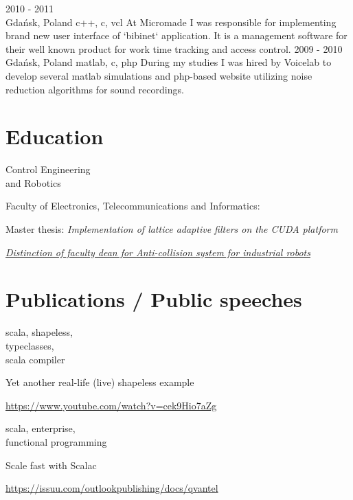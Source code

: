 \documentclass[a4paper,11pt]{cv4tw}%
\begin{document}
      {2010 - 2011\\Gdańsk, Poland}
      {c++, c, vcl}
      {At Micromade I was responsible for implementing brand new user interface of `bibinet` application.
        It is a management software for their well known product for work time tracking and access control.
      }
      {2009 - 2010\\Gdańsk, Poland}
      {matlab, c, php}
      {During my studies I was hired by Voicelab to develop several matlab simulations
        and php-based website utilizing noise reduction algorithms for sound recordings.
      }
\section{Education}
      {Control Engineering\\and Robotics}
      {Faculty of Electronics, Telecommunications and Informatics:
        \begin{missions}
          \item Master thesis: \textit{Implementation of lattice adaptive filters on the CUDA platform}
          \item \href{https://projektgrupowy.eti.pg.gda.pl/editions/2/projects/496/posters/138}{\emph{Distinction of faculty dean for \itshape Anti-collision system for industrial robots}}
        \end{missions}
      }

      \section{Publications / Public speeches}
      \label{Publications}
      {scala, shapeless,\\typeclasses,\\scala compiler}
      {Yet another real-life (live) shapeless example
        \begin{missions}
          \item \href{https://www.youtube.com/watch?v=cek9Hio7aZg}{https://www.youtube.com/watch?v=cek9Hio7aZg}
        \end{missions}
      }
      {scala, enterprise,\\functional programming}
      {Scale fast with Scalac
        \begin{missions}
          \item \href{https://issuu.com/outlookpublishing/docs/qvantel}{https://issuu.com/outlookpublishing/docs/qvantel}
        \end{missions}
      }
\end{document}
